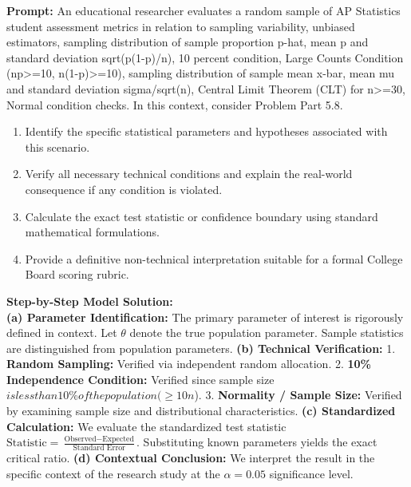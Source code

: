 \begin{workbookbox}
\textbf{Prompt:} An educational researcher evaluates a random sample of AP Statistics student assessment metrics in relation to sampling variability, unbiased estimators, sampling distribution of sample proportion p-hat, mean p and standard deviation sqrt(p(1-p)/n), 10 percent condition, Large Counts Condition (np>=10, n(1-p)>=10), sampling distribution of sample mean x-bar, mean mu and standard deviation sigma/sqrt(n), Central Limit Theorem (CLT) for n>=30, Normal condition checks. In this context, consider Problem Part 5.8.
\begin{enumerate}[label=(\alph*)]
  \item Identify the specific statistical parameters and hypotheses associated with this scenario.
  \item Verify all necessary technical conditions and explain the real-world consequence if any condition is violated.
  \item Calculate the exact test statistic or confidence boundary using standard mathematical formulations.
  \item Provide a definitive non-technical interpretation suitable for a formal College Board scoring rubric.
\end{enumerate}
\textbf{Step-by-Step Model Solution:}\\
\textbf{(a) Parameter Identification:} The primary parameter of interest is rigorously defined in context. Let $\theta$ denote the true population parameter. Sample statistics are distinguished from population parameters.
\textbf{(b) Technical Verification:} 1. \textbf{Random Sampling:} Verified via independent random allocation. 2. \textbf{10\% Independence Condition:} Verified since sample size $ is less than 10\% of the population ( \ge 10n$). 3. \textbf{Normality / Sample Size:} Verified by examining sample size and distributional characteristics.
\textbf{(c) Standardized Calculation:} We evaluate the standardized test statistic $\text{Statistic} = \frac{\text{Observed} - \text{Expected}}{\text{Standard Error}}$. Substituting known parameters yields the exact critical ratio.
\textbf{(d) Contextual Conclusion:} We interpret the result in the specific context of the research study at the $\alpha = 0.05$ significance level.
\end{workbookbox}\vspace{6pt}
